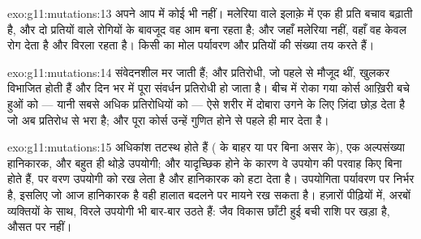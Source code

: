 \begin{solution}{exo:g11:mutations:13}
अपने आप में कोई भी नहीं। मलेरिया वाले इलाक़े में एक ही प्रति बचाव बढ़ाती
है, और दो प्रतियों वाले रोगियों के बावजूद वह  आम बना रहता है; और
जहाँ मलेरिया नहीं, वहाँ वह केवल रोग देता है और विरला रहता है। किसी
 का मोल पर्यावरण और प्रतियों की संख्या तय करते हैं।
\end{solution}

\begin{solution}{exo:g11:mutations:14}
संवेदनशील  मर जाती हैं; और प्रतिरोधी, जो पहले से मौजूद थीं, खुलकर
विभाजित होती हैं और दिन भर में पूरा संवर्धन प्रतिरोधी हो जाता है। बीच में
रोका गया कोर्स आख़िरी बचे हुओं को --- यानी सबसे अधिक प्रतिरोधियों को ---
ऐसे शरीर में दोबारा उगने के लिए ज़िंदा छोड़ देता है जो अब प्रतिरोध से भरा
है; और पूरा कोर्स उन्हें गुणित होने से पहले ही मार देता है।
\end{solution}

\begin{solution}{exo:g11:mutations:15}
अधिकांश  तटस्थ होते हैं ( के बाहर या  पर बिना असर
के), एक अल्पसंख्या हानिकारक, और बहुत ही थोड़े उपयोगी; और यादृच्छिक होने के
कारण वे उपयोग की परवाह किए बिना होते हैं, पर वरण उपयोगी को रख लेता है और
हानिकारक को हटा देता है। उपयोगिता पर्यावरण पर निर्भर है, इसलिए जो
 आज हानिकारक है वही हालात बदलने पर मायने रख सकता है। हज़ारों
पीढ़ियों में, अरबों व्यक्तियों के साथ, विरले उपयोगी  भी
बार-बार उठते हैं: जैव विकास छाँटी हुई बची राशि पर खड़ा है, औसत
 पर नहीं।
\end{solution}

